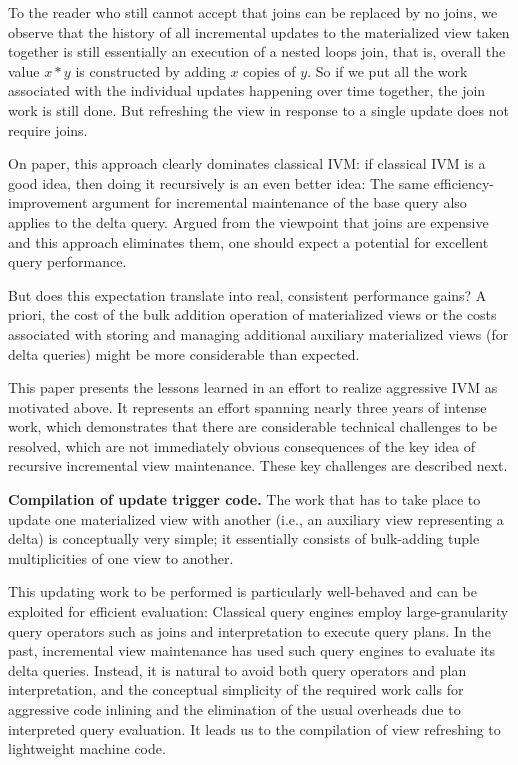 To the reader who still cannot accept that joins can be replaced by no joins, we observe that the history of all incremental updates to the materialized view taken together is still essentially an execution of a nested loops join, that is, overall the value $x*y$ is constructed by adding $x$ copies of $y$. So if we put all the work associated with the individual updates happening over time together, the join work is still done. But refreshing the view in response to a single update does not require joins.


On paper, this approach clearly dominates classical IVM: if classical IVM is a good idea, then doing it recursively is an even better idea: The same efficiency-improvement argument for incremental maintenance of the base query also applies to the delta query. Argued from the viewpoint that joins are expensive and this approach eliminates them, one should expect a potential for excellent query performance.

But does this expectation translate into real, consistent performance gains? A priori, the cost of the bulk addition operation of materialized views or the costs associated with storing and managing additional auxiliary materialized views (for delta queries) might be more considerable than expected.


\medskip


This paper presents the lessons learned in an effort to realize aggressive IVM as motivated above. It represents an effort spanning nearly three years of intense work, which demonstrates that there are considerable technical challenges to be resolved, which are not immediately obvious consequences of the key idea of recursive incremental view maintenance. These key challenges are described next.

{\bf Compilation of update trigger code.}
%
The work that has to take place to update one materialized view with another (i.e., an auxiliary view representing a delta) is conceptually very simple; it essentially consists of bulk-adding tuple multiplicities of one view to another.

This updating work to be performed is particularly well-behaved and can be exploited for efficient evaluation:
Classical query engines employ large-granularity query operators such as joins and interpretation to execute query plans. In the past, incremental view maintenance has used such query engines to evaluate its delta queries.
Instead, it is natural to avoid both query operators and plan interpretation, and the conceptual simplicity of the required work calls for aggressive code inlining and the elimination of the usual overheads due to interpreted query evaluation. It leads us to the compilation of view refreshing to lightweight machine code.

